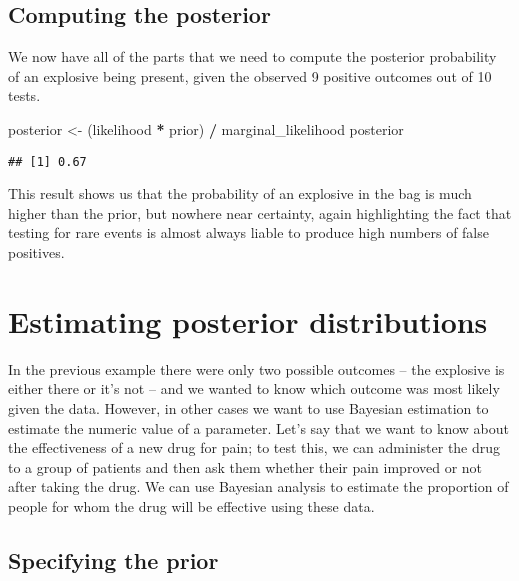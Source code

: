 \documentclass[]{book}
\newenvironment{Shaded}{\begin{snugshade}}{\end{snugshade}}
\newcommand{\StringTok}[1]{\textcolor[rgb]{0.31,0.60,0.02}{#1}}
\newcommand{\OperatorTok}[1]{\textcolor[rgb]{0.81,0.36,0.00}{\textbf{#1}}}
\newcommand{\NormalTok}[1]{#1}
\theoremstyle{definition}
\theoremstyle{definition}
\theoremstyle{definition}
\theoremstyle{remark}
\begin{document}
\subsection{Computing the posterior}\label{computing-the-posterior}

We now have all of the parts that we need to compute the posterior
probability of an explosive being present, given the observed 9 positive
outcomes out of 10 tests.

\begin{Shaded}
\begin{Highlighting}[]
\NormalTok{posterior <-}\StringTok{ }\NormalTok{(likelihood }\OperatorTok{*}\StringTok{ }\NormalTok{prior) }\OperatorTok{/}\StringTok{ }\NormalTok{marginal_likelihood}
\NormalTok{posterior}
\end{Highlighting}
\end{Shaded}

\begin{verbatim}
## [1] 0.67
\end{verbatim}

This result shows us that the probability of an explosive in the bag is
much higher than the prior, but nowhere near certainty, again
highlighting the fact that testing for rare events is almost always
liable to produce high numbers of false positives.

\section{Estimating posterior
distributions}\label{estimating-posterior-distributions}

In the previous example there were only two possible outcomes -- the
explosive is either there or it's not -- and we wanted to know which
outcome was most likely given the data. However, in other cases we want
to use Bayesian estimation to estimate the numeric value of a parameter.
Let's say that we want to know about the effectiveness of a new drug for
pain; to test this, we can administer the drug to a group of patients
and then ask them whether their pain improved or not after taking the
drug. We can use Bayesian analysis to estimate the proportion of people
for whom the drug will be effective using these data.

\subsection{Specifying the prior}\label{specifying-the-prior-1}
\end{document}
